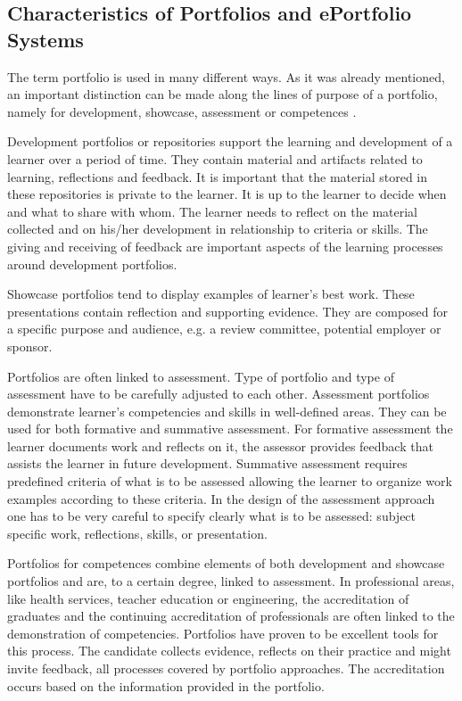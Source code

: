 \subsection{Characteristics of Portfolios and ePortfolio Systems}
The term portfolio is used in many different ways. As it was already
mentioned, an important distinction can be made along the lines of purpose of a
portfolio, namely for development, showcase, assessment or competences
\citep{VanTartwijkJ.2004}.

Development portfolios or repositories support the learning and development of a
learner over a period of time. They contain material and artifacts related to
learning, reflections and feedback. It is important that the material stored in
these repositories is private to the learner. It is up to the learner to decide
when and what to share with whom. The learner needs to reflect on the material
collected and on his/her development in relationship to criteria or skills. The
giving and receiving of feedback are important aspects of the learning processes
around development portfolios.

Showcase portfolios tend to display examples of learner's best work. These
presentations contain reflection and supporting evidence. They are composed for
a specific purpose and audience, e.g. a review committee, potential employer or
sponsor.

Portfolios are often linked to assessment. Type of portfolio and type of
assessment have to be carefully adjusted to each other. Assessment portfolios
demonstrate learner's competencies and skills in well-defined areas. They can be
used for both formative and summative assessment. For formative assessment the
learner documents work and reflects on it, the assessor provides feedback that
assists the learner in future development. Summative assessment requires
predefined criteria of what is to be assessed allowing the learner to organize
work examples according to these criteria. In the design of the assessment
approach one has to be very careful to specify clearly what is to be assessed:
subject specific work, reflections, \LLLs skills, or presentation.

Portfolios for competences combine elements of both development and showcase
portfolios and are, to a certain degree, linked to assessment. In professional
areas, like health services, teacher education or engineering, the accreditation
of graduates and the continuing accreditation of professionals are often linked
to the demonstration of competencies. Portfolios have proven to be excellent
tools for this process. The candidate collects evidence, reflects on their
practice and might invite feedback, all processes covered by portfolio
approaches. The accreditation occurs based on the information provided in the
portfolio.

